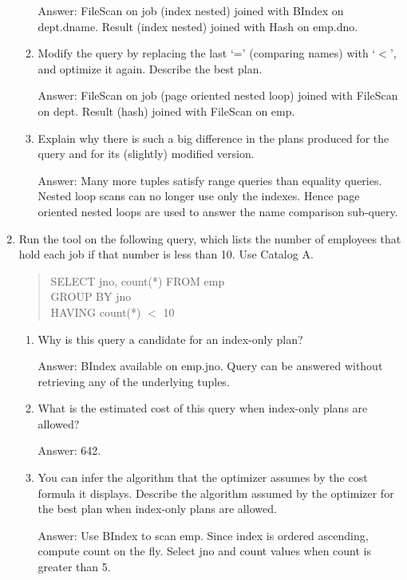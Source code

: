 \begin{enumerate}
\begin{enumerate}
Answer: FileScan on job (index nested) joined with BIndex on dept.dname.
Result (index nested) joined with Hash on emp.dno.
    
\item
Modify the query by replacing the last `=' (comparing names) with `$<$',
and optimize it again.  Describe the best plan.
    
Answer: FileScan on job (page oriented nested loop) joined with FileScan
on dept.  Result (hash) joined with FileScan on emp. 
    
\item
Explain why there is such a big difference in the plans produced for
the query and for its (slightly) modified version.
    
Answer: Many more tuples satisfy range queries than equality queries.
Nested loop scans can no longer use only the indexes.  Hence page oriented
nested loops are used to answer the name comparison sub-query.
\end{enumerate}


\item
Run the tool on the following query, which lists the number of employees
that hold each job if that number is less than 10.  Use Catalog A.

\begin{quote}
	SELECT jno, count(*) FROM emp\\
	GROUP BY jno\\
	HAVING count(*) $<$ 10
\end{quote}

\begin{enumerate}
\item
Why is this query a candidate for an index-only plan?

Answer: BIndex available on emp.jno.  Query can be answered without
retrieving any of the underlying tuples.

\item
What is the estimated cost of this query when index-only plans are
allowed?

Answer: 642.

\item
You can infer the algorithm that the optimizer assumes by the cost
formula it displays.  Describe the algorithm assumed by the optimizer
for the best plan when index-only plans are allowed.

Answer: Use BIndex to scan emp.  Since index is ordered ascending,
compute count on the fly.  Select jno and count values when count is
greater than 5.


\end{enumerate}
\end{enumerate}
